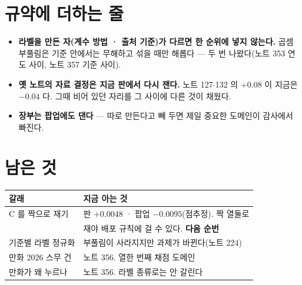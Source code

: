 \documentclass[11pt]{article}
\begin{document}
\section{규약에 더하는 줄}

\begin{itemize}
\item \textbf{라벨을 만든 자(계수 방법 · 출처 기준)가 다르면 한 순위에
넣지 않는다.} 곱셈 부풀림은 기준 안에서는 무해하고 섞을 때만 해롭다 ---
두 번 나왔다(노트 353 연도 사이, 노트 357 기준 사이).
\item \textbf{옛 노트의 자료 결정은 지금 판에서 다시 잰다.} 노트
127$\cdot$132 의 $+0.08$ 이 지금은 $-0.04$ 다. 그때 비어 있던 자리를
그 사이에 다른 것이 채웠다.
\item \textbf{장부는 팝업에도 댄다} --- 따로 만든다고 빼 두면 제일 중요한
도메인이 감사에서 빠진다.
\end{itemize}

\section{남은 것}

\begin{center}
\begin{tabular}{ll}
\hline
갈래 & 지금 아는 것 \\
\hline
C 를 짝으로 재기 & 판 $+0.0048$ · 팝업 $-0.0095$(점추정). 짝 열둘로 \\
                & 재야 배포 규칙에 걸 수 있다. \textbf{다음 순번} \\
기준별 라벨 정규화 & 부풀림이 사라지지만 과제가 바뀐다(노트 224) \\
만화 2026 스무 건 & 노트 356. 열한 번째 채점 도메인 \\
만화가 왜 누르나 & 노트 356. 라벨 종류로는 안 갈린다 \\
\hline
\end{tabular}
\end{center}
\end{document}
